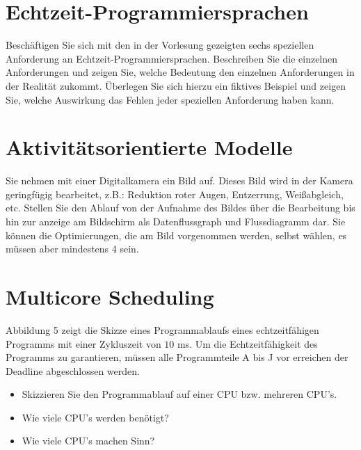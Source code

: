\documentclass[12pt,a4paper,ngerman]{article}
\begin{document}
\pagebreak
{}
\pagebreak

\section*{Echtzeit-Programmiersprachen}


\begin{framed}
Beschäftigen Sie sich mit den in der Vorlesung gezeigten sechs speziellen Anforderung an Echtzeit-Programmiersprachen. Beschreiben Sie die einzelnen Anforderungen und zeigen Sie, welche Bedeutung den einzelnen Anforderungen in der Realität zukommt. Überlegen Sie sich hierzu ein fiktives Beispiel und zeigen Sie, welche Auswirkung das Fehlen jeder speziellen Anforderung haben kann. 
\end{framed}
\pagebreak

\section*{Aktivitätsorientierte Modelle}


\begin{framed}
Sie nehmen mit einer Digitalkamera ein Bild auf. Dieses Bild wird in der Kamera geringfügig bearbeitet, z.B.: Reduktion roter Augen, Entzerrung, Weißabgleich, etc. Stellen Sie den Ablauf von der Aufnahme des Bildes über die Bearbeitung bis hin zur anzeige am Bildschirm als Datenflussgraph und Flussdiagramm dar. Sie können die Optimierungen, die am Bild vorgenommen werden, selbst wählen, es müssen aber mindestens 4 sein.
\end{framed}

\pagebreak

\section*{Multicore Scheduling}


\begin{framed}
Abbildung 5 zeigt die Skizze eines Programmablaufs eines echtzeitfähigen Programms mit einer Zykluszeit von $10$ ms. Um die Echtzeitfähigkeit des Programms zu garantieren, müssen alle Programmteile A bis J vor erreichen der Deadline abgeschlossen werden. \\
\begin{itemize}
\item Skizzieren Sie den Programmablauf auf einer CPU bzw. mehreren CPU's.
\item Wie viele CPU's werden benötigt?
\item Wie viele CPU's machen Sinn?
\end{itemize}
\end{framed}



   
   
\end{document}
